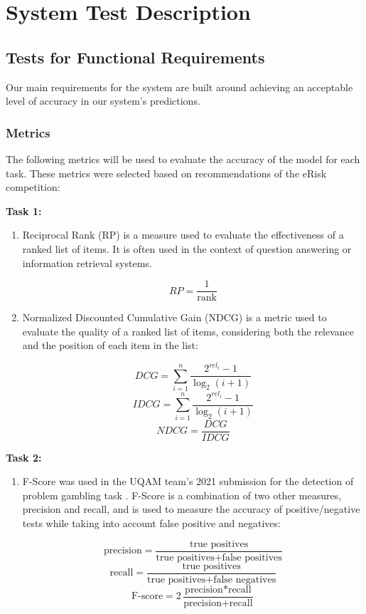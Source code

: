 \documentclass[12pt, titlepage]{article}
\begin{document}
\section{System Test Description}
	
\subsection{Tests for Functional Requirements}

Our main requirements for the system are built around achieving an acceptable level of accuracy in our system's predictions.

\subsubsection{Metrics} \label{metrics}

The following metrics will be used to evaluate the accuracy of the model for each task. These metrics were selected based on recommendations of the eRisk competition:\newline

\noindent \textbf{Task 1:}

\begin{enumerate}

\item{Reciprocal Rank (RP)} is a measure used to evaluate the effectiveness of a ranked list of items. It is often used in the context of question answering or information retrieval systems.

$$RP = \frac{1}{\text{rank}}$$

\item{Normalized Discounted Cumulative Gain (NDCG)} is a metric used to evaluate the quality of a ranked list of items, considering both the relevance and the position of each item in the list:

$$DCG = \sum_{i=1}^{n} \frac{2^{rel_i} - 1}{\log_2(i + 1)}$$
$$IDCG = \sum_{i=1}^{n} \frac{2^{rel_i} - 1}{\log_2(i + 1)}$$
$$NDCG = \frac{DCG}{IDCG}$$

\end{enumerate}

\noindent \textbf{Task 2:}

\begin{enumerate}

\item{F-Score} was used in the UQAM team's 2021 submission for the detection of problem gambling task \citep{Maupom2021EarlyDO}. F-Score is a combination of two other measures, precision and recall, and is used to measure the accuracy of positive/negative tests while taking into account false positive and negatives:

$$\text{precision} = \frac{\text{true positives}}{\text{true positives} + \text{false positives}}$$
$$\text{recall} = \frac{\text{true positives}}{\text{true positives} + \text{false negatives}}$$
$$\text{F-score} = 2\frac{\text{precision} * \text{recall}}{\text{precision} + \text{recall}}$$

\end{enumerate}
\end{document}
